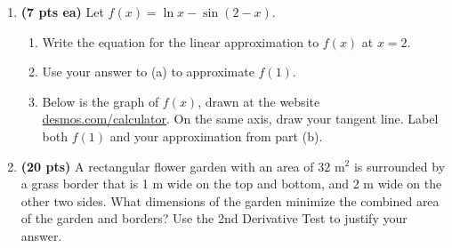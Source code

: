 \documentclass[12pt]{article}
\begin{document}
\begin{enumerate}
\newpage
\item {\bf (7 pts ea)} Let 
	$f(x)=\ln x - \sin{(2-x)}$. %
	\begin{enumerate}
	\item Write the equation for the linear approximation to $f(x)$ at $x=2$.
	\vspace{12pc}
	
	\item Use your answer to (a) to approximate $f(1)$.
	\vspace{4pc}
	
	\item Below is the graph of $f(x)$, drawn at the website \url{desmos.com/calculator}. On the same axis, draw your tangent line.  Label both $f(1)$ and your approximation from part (b).
	\vspace{2pc}
	
	\end{enumerate}
	
\newpage
%
\item {\bf (20 pts)} A rectangular flower garden with an area of 32 $\text{m}^2$ is surrounded by a grass border that is 1 m wide on the top and bottom, and 2 m wide on the other two sides.  What dimensions of the garden minimize the combined area of the garden and borders?  Use the 2nd Derivative Test to justify your answer.  %


\end{enumerate}
\end{document}
